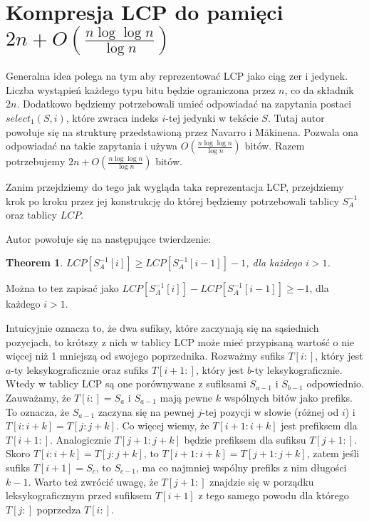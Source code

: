 \documentclass{article}
\newtheorem{theorem}{Theorem}
\begin{document}
\section{Kompresja LCP do pamięci $2n + O(\frac{n \log\log{n}}{\log{n}})$}

Generalna idea polega na tym aby reprezentować LCP jako ciąg zer i jedynek. Liczba wystąpień każdego typu bitu będzie ograniczona przez $n$, co da składnik $2n$. Dodatkowo będziemy potrzebowali umieć odpowiadać na zapytania postaci $select_1(S, i)$, które zwraca indeks $i$-tej jedynki w tekście $S$. Tutaj autor powołuje się na strukturę przedstawioną przez Navarro i M\"akinena. Pozwala ona odpowiadać na takie zapytania i używa $O(\frac{n \log\log{n}}{\log{n}})$ bitów. Razem potrzebujemy $2n +  O(\frac{n \log\log{n}}{\log{n}})$ bitów.

Zanim przejdziemy do tego jak wygląda taka reprezentacja LCP, przejdziemy krok po kroku przez jej konstrukcję do której będziemy potrzebowali tablicy $S_A^{-1}$ oraz tablicy $LCP$. 

Autor powołuje się na następujące twierdzenie:

\begin{theorem}
$LCP[S_A^{-1}[i]] \ge LCP[S_A^{-1}[i - 1]] - 1$, dla każdego $ i > 1$.
\end{theorem}

Można to tez zapisać jako $LCP[S_A^{-1}[i]] - LCP[S_A^{-1}[i - 1]] \ge - 1$, dla każdego $ i > 1$.

Intuicyjnie oznacza to, że dwa sufiksy, które zaczynają się na sąsiednich pozycjach, to krótszy z nich w tablicy LCP może mieć przypisaną wartość o nie więcej niż 1 mniejszą od swojego poprzednika. Rozważmy sufiks $T[i:]$, który jest $a$-ty leksykograficznie oraz sufiks $T[i+1:]$, który jest $b$-ty leksykograficznie. Wtedy w tablicy LCP są one porównywane z sufiksami $S_{a-1}$ i $S_{b-1}$ odpowiednio. Zauważamy, że $T[i:] = S_a$ i $S_{a-1}$ mają pewne $k$ wspólnych bitów jako prefiks. To oznacza, że $S_{a-1}$ zaczyna się na pewnej $j$-tej pozycji w słowie (różnej od $i$) i $T[i:i+k] = T[j:j+k]$. Co więcej wiemy, że $T[i+1:i+k]$ jest prefiksem dla $T[i+1:]$. Analogicznie $T[j+1:j+k]$ będzie prefiksem dla sufiksu $T[j+1:]$. Skoro $T[i:i+k] = T[j:j+k]$, to $T[i+1:i+k] = T[j+1: j+k]$, zatem jeśli sufiks $T[i+1] = S_c$, to $S_{c-1}$, ma co najmniej wspólny prefiks z nim długości $k-1$. Warto też zwrócić uwagę, że $T[j+1:]$ znajdzie się w porządku leksykograficznym przed sufiksem $T[i+1]$ z tego samego powodu dla którego $T[j:]$ poprzedza $T[i:]$.
\end{document}
